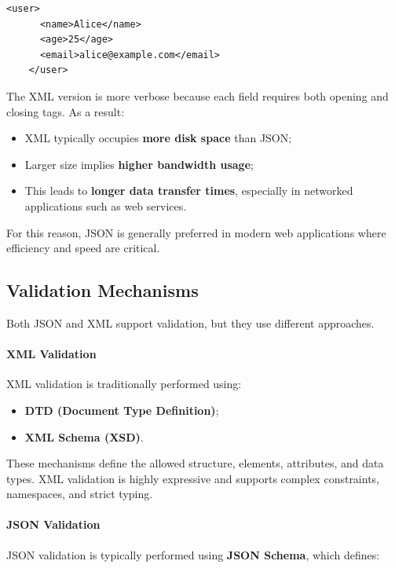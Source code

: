 \documentclass{scrbook}
\begin{document}
	\begin{lstlisting}[caption={XML representation}]
	<user>
	  <name>Alice</name>
	  <age>25</age>
	  <email>alice@example.com</email>
	</user>
	\end{lstlisting}
	
	The XML version is more verbose because each field requires both opening and closing tags. As a result:
	
	\begin{itemize}
		\item XML typically occupies \textbf{more disk space} than JSON;
		\item Larger size implies \textbf{higher bandwidth usage};
		\item This leads to \textbf{longer data transfer times}, especially in networked applications such as web services.
	\end{itemize}
	
	For this reason, JSON is generally preferred in modern web applications where efficiency and speed are critical.
	
	\subsection{Validation Mechanisms}
	
	Both JSON and XML support validation, but they use different approaches.
	
	\paragraph{XML Validation}
	
	XML validation is traditionally performed using:
	
	\begin{itemize}
		\item \textbf{DTD (Document Type Definition)};
		\item \textbf{XML Schema (XSD)}.
	\end{itemize}
	
	These mechanisms define the allowed structure, elements, attributes, and data types. XML validation is highly expressive and supports complex constraints, namespaces, and strict typing.
	
	\paragraph{JSON Validation}
	
	JSON validation is typically performed using \textbf{JSON Schema}, which defines:
	
\end{document}
